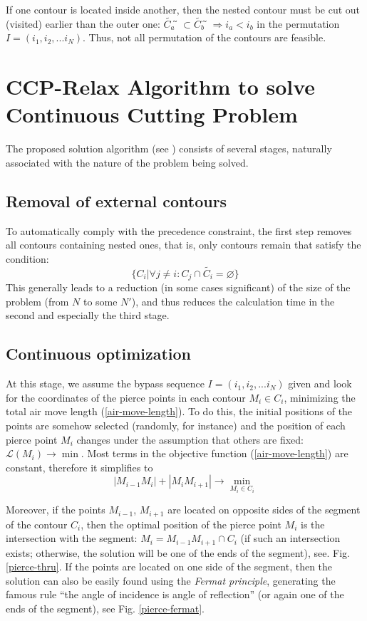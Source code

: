 \documentclass[]{llncs}
\begin{document}
If one contour is located inside another,
then the nested contour must be cut out
(visited)
earlier than the outer one:
$\tilde{C_a} ̃\subset \tilde{C_b} ̃\Rightarrow i_a < i_b$
in the permutation
$I = (i_1, i_2, ... i_N)$.
Thus, not all permutation of the contours are feasible.

\section{CCP-Relax Algorithm to solve Continuous Cutting Problem}
\label{sec:ccp-relax}

The proposed solution algorithm
(see \cite{berlin2019})
consists of several stages,
naturally associated with the nature of the problem being solved.

\subsection{Removal of external contours}

To automatically comply with the precedence constraint,
the first step removes all contours containing nested ones,
that is, only contours remain that satisfy the condition:
$$
\{C_i | \forall j \ne i: C_j \cap \tilde{C_i} = \varnothing \}
$$
This generally leads to a reduction
(in some cases significant)
of the size of the problem
(from $N$ to some $N'$),
and thus reduces the calculation time
in the second and especially the third stage.

\subsection{Continuous optimization}

At this stage,
we assume the bypass sequence
$I = (i_1, i_2, ... i_N)$
given and look for the coordinates of the pierce points
in each contour
$M_i \in C_i$,
minimizing the total air move length (\ref{air-move-length}).
To do this, the initial positions of the points are somehow selected
(randomly, for instance)
and the position of each pierce point $M_i$
changes under the assumption that others are fixed:
$\mathcal{L}(M_i) \to \min$.
Most terms in the objective function
(\ref{air-move-length})
are constant, therefore it simplifies to
$$
|M_{i-1}M_i|+|M_iM_{i+1}| \to \min_{M_i \in C_i}
$$

Moreover,
if the points
$M_{i-1}$,
$M_{i + 1}$
are located on opposite sides of the segment of the contour
$C_i$,
then the optimal position of the
pierce point $M_i$ is the intersection with the segment:
$M_i = M_{i-1} M_{i + 1} \cap C_i$
(if such an intersection exists;
otherwise,
the solution will be one of the ends of the segment),
see. Fig. \ref{pierce-thru}.
If the points are located on one side of the segment,
then the solution can also be easily found using the
\textit{Fermat principle},
generating the famous rule
``the angle of incidence is angle of reflection''
(or again one of the ends of the segment),
see Fig. \ref{pierce-fermat}.
\end{document}
